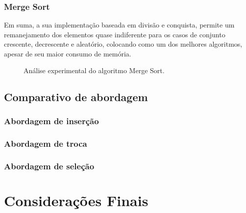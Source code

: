 \documentclass[conference]{IEEEtran}
\begin{document}
\subsubsection{Merge Sort}

Em suma, a sua implementação baseada em divisão e conquista, permite um remanejamento dos elementos quase indiferente para os casos de conjunto crescente, decrescente e aleatório, colocando como um dos melhores algoritmos, apesar de seu maior consumo de memória.

\begin{figure}
\label{image: graph-merge}

\centering
{}
\caption{Análise experimental do algoritmo Merge Sort.}
\end{figure}

\subsection{Comparativo de abordagem}

\subsubsection{Abordagem de inserção}
\subsubsection{Abordagem de troca}
\subsubsection{Abordagem de seleção}



\section{Considerações Finais}
\end{document}
